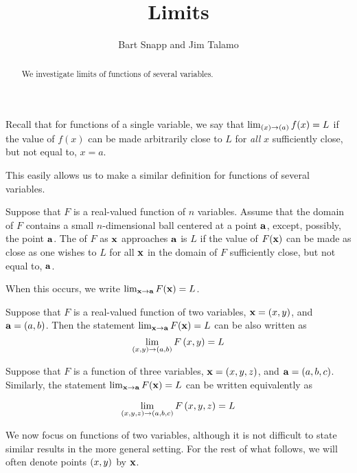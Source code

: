 \documentclass{ximera}
\author{Bart Snapp and Jim Talamo}
\title[Dig-In:]{Limits}
\begin{document}
\begin{abstract}
We investigate limits of functions of several variables.
\end{abstract}
\maketitle

Recall that for functions of a single variable, we say that $\lim_{\left(x\right) \to \left(a\right)} f(x) = L$ if the value of $f(x)$ can be made arbitrarily close to $L$ for \emph{all} $x$ sufficiently close, but not equal to, $x=a$.

This easily allows us to make a similar definition for functions of several variables.

\begin{definition}
 Suppose that $F$ is a real-valued function of $n$ variables. Assume that the domain of $F$ contains a small $n$-dimensional ball centered at a point $\mathbf{a}$, except, possibly, the point $\mathbf{a}$.
  The  of $F$ as $\mathbf{x}$ approaches $\mathbf{a}$ is $L$ if the value of $F(\mathbf{x})$ can be made as close as one wishes to $L$ for all $\mathbf{x}$ in the domain of $F$ sufficiently close, but not equal to, $\mathbf{a}$.

 When this occurs, we write $\lim_{\mathbf{x}\to \mathbf{a}} F(\mathbf{x}) = L$.
\end{definition}

 \begin{remark}
  Suppose that $F$ is a real-valued function of two variables, $\mathbf{x} = \left(x,y\right)$, and $\mathbf{a} =
  \left(a,b\right)$.
  Then the statement $\lim_{\mathbf{x}\to \mathbf{a}} F(\mathbf{x}) = L$ can be also written as
    \[
    \lim_{\left(x,y\right)\to \left(a,b\right) }F\left(x,y\right) = L
    \]
\end{remark}
  \begin{remark}
    Suppose that $F$ is a function of three variables, $\mathbf{x} = \left(x,y,z\right)$, and
    $\mathbf{a} = \left(a,b,c\right)$. Similarly, the statement  $\lim_{\mathbf{x}\to
      \mathbf{a}} F(\mathbf{x}) = L$ can be written equivalently as

      \[
      \lim_{\left(x,y,z\right)\to \left(a,b,c\right)} F\left(x,y,z\right) = L
      \]


\end{remark}

We now focus on functions of two variables, although it is not difficult to state similar results in the more general setting.  For the rest of what follows, we will often denote points $\left(x,y\right)$ by $\mathbf{x}$.
\end{document}
